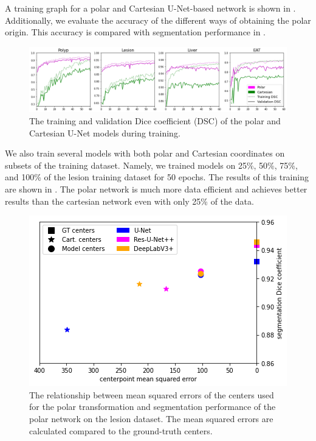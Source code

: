
A training graph for a polar and Cartesian U-Net-based network is shown in . Additionally, we evaluate the accuracy of the different ways of obtaining the polar origin. This accuracy is compared with segmentation performance in .

	\begin{figure}[b!]
		\centering
		\includegraphics[width=\linewidth]{images/4/training-graphs}
		\caption{The training and validation Dice coefficient (DSC) of the polar and Cartesian U-Net models during training. \cite{bencevicTrainingPolarImage2021}}
		\label{fig:training}
	\end{figure}
		
We also train several models with both polar and Cartesian coordinates on subsets of the training dataset. Namely, we trained models on 25\%, 50\%, 75\%, and 100\% of the lesion training dataset for 50 epochs. The results of this training are shown in . The polar network is much more data efficient and achieves better results than the cartesian network even with only 25\% of the data.

	\begin{figure}[t!]
		\centering
		\includegraphics[width=0.65\linewidth]{images/4/mse-vs-dice}
		\caption{The relationship between mean squared errors of the centers used for the polar transformation and segmentation performance of the polar network on the lesion dataset. The mean squared errors are calculated compared to the ground-truth centers. \cite{bencevicTrainingPolarImage2021}}
		\label{fig:centers-vs-performance}
	\end{figure}
	
